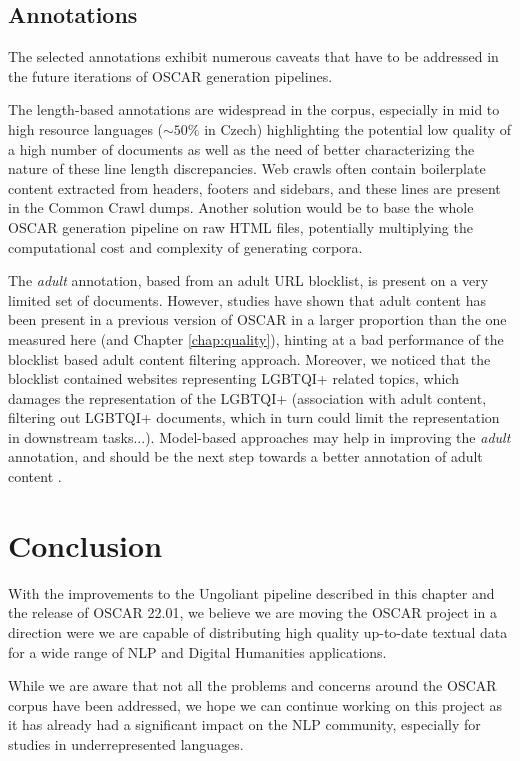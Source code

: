 \subsection{Annotations}

The selected annotations exhibit numerous caveats that have to be addressed in the future iterations of OSCAR generation pipelines.

The length-based annotations are widespread in the corpus, especially in mid to high resource languages ($\sim50\%$ in Czech) highlighting the potential low quality of a high number of documents as well as the need of better characterizing the nature of these line length discrepancies. Web crawls often contain boilerplate content extracted from headers, footers and sidebars, and these lines are present in the Common Crawl dumps.
Another solution would be to base the whole OSCAR generation pipeline on raw HTML files, potentially multiplying the computational cost and complexity of generating corpora.

The \textit{adult} annotation, based from an adult URL blocklist, is present on a very limited set of documents. However, studies have shown that adult content has been present in a previous version of OSCAR in a larger proportion than the one measured here \citep{kreutzer-etal-2021-quality} (and Chapter \ref{chap:quality}), hinting at a bad performance of the blocklist based adult content filtering approach. Moreover, we noticed that the blocklist contained websites representing LGBTQI+ related topics, which damages the representation of the LGBTQI+ (association with adult content, filtering out LGBTQI+ documents, which in turn could limit the representation in downstream tasks...).
Model-based approaches may help in improving the \textit{adult} annotation, and should be the next step towards a better annotation of adult content \citep{luccioni-viviano-2021-whats}.


\section{Conclusion}

With the improvements to the Ungoliant pipeline described in this chapter and the release of OSCAR 22.01, we believe we are moving the OSCAR project in a direction were we are capable of distributing high quality up-to-date textual data for a wide range of NLP and Digital Humanities applications.

While we are aware that not all the problems and concerns around the OSCAR corpus have been addressed, we hope we can continue working on this project as it has already had a significant impact on the NLP community, especially for studies in underrepresented languages.

